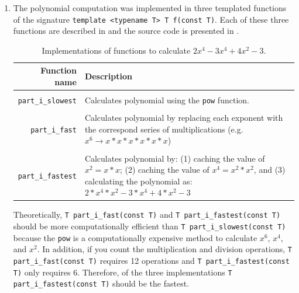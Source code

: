\documentclass{article}
\begin{document}
\begin{enumerate}[label=\roman*)]
  \item The polynomial computation was implemented in three templated functions of the signature \texttt{template <typename T> T f(const T)}.
    Each of these three functions are described in  and the source code is presented in .

    \begin{table} \label{tab:parti}
      \caption{Implementations of functions to calculate $2x^4 - 3x^4 + 4x^2 - 3$.}
    \begin{tabularx}{\linewidth}{ r X }
      \textbf{Function name} & \textbf{Description} \\
      \hline & \\
      \texttt{part\_i\_slowest} & Calculates polynomial using the \texttt{pow} function.\\
      \\
      \texttt{part\_i\_fast} & Calculates polynomial by replacing each exponent with the correspond series of multiplications (e.g. $x^6 \rightarrow x*x*x*x*x*x$)\\
      \\
      \texttt{part\_i\_fastest} & Calculates polynomial by: (1) caching the value of $x^2 = x*x$; (2) caching the value of $x^4 = x^2 * x^2$, and (3) calculating the polynomial as: $2*x^4*x^2 - 3*x^4 + 4*x^2 - 3$\\
    \end{tabularx}
  \end{table}

    Theoretically, \texttt{T part\_i\_fast(const T)} and \texttt{T part\_i\_fastest(const T)} should be more computationally efficient than \texttt{T part\_i\_slowest(const T)} because the \texttt{pow} is a computationally expensive method to calculate $x^6$, $x^4$, and $x^2$.
    In addition, if you count the multiplication and division operations, \texttt{T part\_i\_fast(const T)} requires 12 operations and \texttt{T part\_i\_fastest(const T)} only requires 6.
    Therefore, of the three implementations \texttt{T part\_i\_fastest(const T)} should be the fastest.
    

\end{enumerate}
\end{document}
